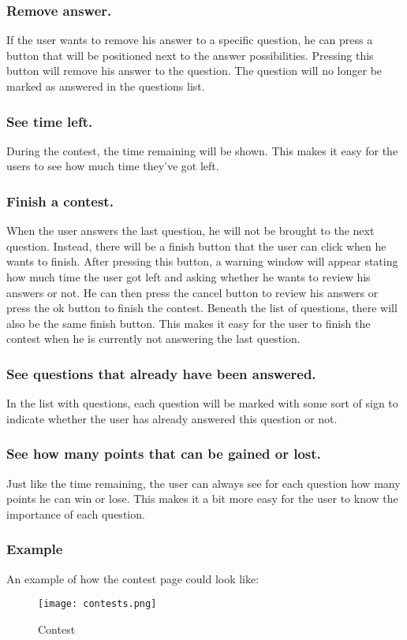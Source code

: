 \subsubsection{Remove answer.} 
If the user wants to remove his answer to a specific question, he can press a button that will be positioned next to the answer possibilities. Pressing this button will remove his answer to the question. The question will no longer be marked as answered in the questions list.

\subsubsection{See time left.} 
During the contest, the time remaining will be shown. This makes it easy for the users to see how much time they've got left. 

\subsubsection{Finish a contest.} 
When the user answers the last question, he will not be brought to the next question. Instead, there will be a finish button that the user can click when he wants to finish. After pressing this button, a warning window will appear stating how much time the user got left and asking whether he wants to review his answers or not. He can then press the cancel button to review his answers or press the ok button to finish the contest. Beneath the list of questions, there will also be the same finish button. This makes it easy for the user to finish the contest when he is currently not answering the last question. 

\subsubsection{See questions that already have been answered.} 
In the list with questions, each question will be marked with some sort of sign to indicate whether the user has already answered this question or not. 

\subsubsection{See how many points that can be gained or lost.}
Just like the time remaining, the user can always see for each question how many points he can win or lose. This makes it a bit more easy for the user to know the importance of each question. 

\subsubsection{Example}
An example of how the contest page could look like: 
		\begin{figure}[h]
		  \centering
			\texttt{[image: contests.png]}
		  \caption{Contest}
		  \label{Contest}
		\end{figure}

